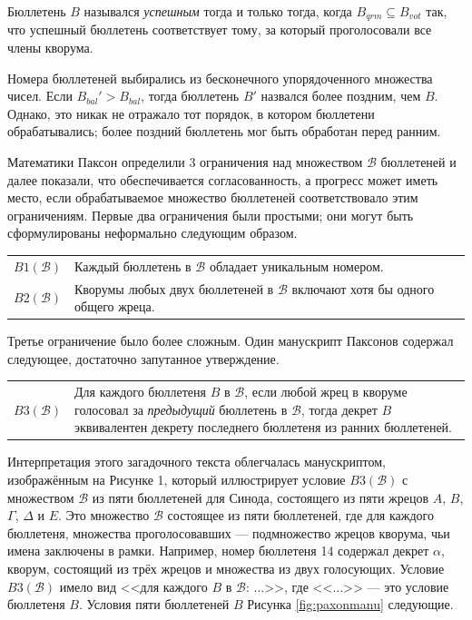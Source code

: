 \documentclass[12pt, a4paper]{article} %
\begin{document}
Бюллетень $B$ назывался \textit{успешным} тогда и только тогда, когда $B_{qrm} \subseteq B_{vot}$ так, что успешный бюллетень соответствует тому, за который проголосовали все члены кворума.

Номера бюллетеней выбирались из бесконечного упорядоченного множества чисел. Если $B_{bal}' > B_{bal}$, тогда бюллетень $B'$ назвался более поздним, чем $B$. Однако, это никак не отражало тот порядок, в котором бюллетени обрабатывались; более поздний бюллетень мог быть обработан перед ранним.

Математики Паксон определили 3 ограничения над множеством $\mathcal{B}$ бюллетеней и далее показали, что обеспечивается согласованность, а прогресс может иметь место, если обрабатываемое множество бюллетеней соответствовало этим ограничениям. Первые два ограничения были простыми; они могут быть сформулированы неформально следующим образом.
\begin{table}[h]
\begin{tabular}{l p{10.5cm}}
    $B1(\mathcal{B})$ & Каждый бюллетень в $\mathcal{B}$ обладает уникальным номером.\\
    $B2(\mathcal{B})$ & Кворумы любых двух бюллетеней в $\mathcal{B}$ включают хотя бы одного общего жреца.
\end{tabular}
\end{table}

Третье ограничение было более сложным. Один манускрипт Паксонов содержал следующее, достаточно запутанное утверждение.
\begin{table}[h]
\begin{tabular}{l p{10.5cm}}
    $B3(\mathcal{B})$ & Для каждого бюллетеня $B$ в $\mathcal{B}$, если любой жрец в кворуме голосовал за \textit{предыдущий} бюллетень в $\mathcal{B}$, тогда декрет $B$ эквивалентен декрету последнего бюллетеня из ранних бюллетеней. 
\end{tabular}
\end{table}

Интерпретация этого загадочного текста облегчалась манускриптом, изображённым на Рисунке 1, который иллюстрирует условие $B3(\mathcal{B})$ с множеством $\mathcal{B}$ из пяти бюллетеней для Синода, состоящего из пяти жрецов $A$, $B$, $\Gamma$, $\Delta$ и $E$. Это множество $\mathcal{B}$ состоящее из пяти бюллетеней, где для каждого бюллетеня, множества проголосовавших --- подмножество жрецов кворума, чьи имена заключены в рамки. Например, номер бюллетеня 14 содержал декрет $\alpha$, кворум, состоящий из трёх жрецов и множества из двух голосующих. Условие $B3(\mathcal{B})$ имело вид <<для каждого $B$ в $\mathcal{B}$: $\ldots$>>, где <<$\ldots$>> --- это условие бюллетеня $B$. Условия пяти бюллетеней $B$ Рисунка \ref{fig:paxonmanu} следующие.
\end{document}
